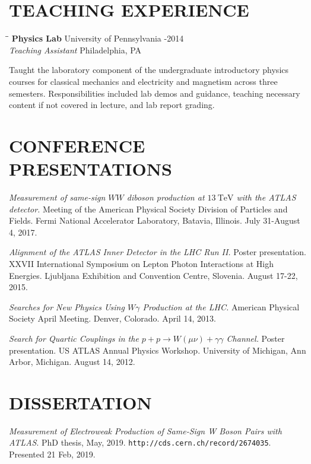 \documentclass{res}
\begin{document}
\begin{resume}
\section{TEACHING EXPERIENCE}\vspace{-5pt}
   \begin{tabbing}
     \hspace{2.5in}\= \hspace{2.9in}\= \kill %
    {\bf Physics Lab} \>University of Pennsylvania     -2014\\
    {\it Teaching Assistant}  \>Philadelphia, PA
   \end{tabbing}\vspace{-18pt}      %
   Taught the laboratory component of the undergraduate introductory physics courses for classical mechanics and electricity and magnetism across three semesters.
   Responsibilities included lab demos and guidance, teaching necessary content if not covered in lecture, and lab report grading.

\section{CONFERENCE PRESENTATIONS}
    {\it Measurement of same-sign $WW$ diboson production at $13~\textrm{TeV}$ with the ATLAS detector.} Meeting of the American Physical Society Division of Particles and Fields.  Fermi National Accelerator Laboratory, Batavia, Illinois. July 31-August 4, 2017.

    {\it Alignment of the ATLAS Inner Detector in the LHC Run II.} Poster presentation.  XXVII International Symposium on Lepton Photon Interactions at High Energies. Ljubljana Exhibition and Convention Centre, Slovenia.  August 17-22, 2015.

    {\it Searches for New Physics Using $W\gamma$ Production at the LHC.} American Physical Society April Meeting. Denver, Colorado. April 14, 2013.

    {\it Search for Quartic Couplings in the $p+p\rightarrow W(\mu\nu)+\gamma\gamma$ Channel.} Poster presentation. US ATLAS Annual Physics Workshop. University of Michigan, Ann Arbor, Michigan.  August 14, 2012.

\section{DISSERTATION}
    {\it Measurement of Electroweak Production of Same-Sign W Boson Pairs with ATLAS}.  PhD thesis, May, 2019. {\tt http://cds.cern.ch/record/2674035}. Presented 21 Feb, 2019.


\end{resume}
\end{document}
